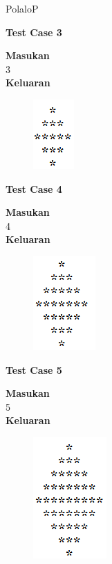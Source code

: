 \begin{permasalahan}{PolaloP}
	\begin{center}
	\textbf{Test Case 3}\\
	\end{center}
	\textbf{Masukan}\\
	3\\
	\textbf{Keluaran}\\
		\begin{figure}[h!]
		\includegraphics{fig/Bintang/3.png}	
		\end{figure}
	\begin{center}
	\textbf{Test Case 4}\\
	\end{center}
	\textbf{Masukan}\\
	4\\
	\textbf{Keluaran}\\
		\begin{figure}[h!]
		\includegraphics{fig/Bintang/4.png}	
		\end{figure}
		\begin{center}
	\textbf{Test Case 5}\\
	\end{center}
	\textbf{Masukan}\\
	5\\
	\textbf{Keluaran}\\
		\begin{figure}[h!]
		\includegraphics{fig/Bintang/5.png}	
		\end{figure}
\end{permasalahan}

